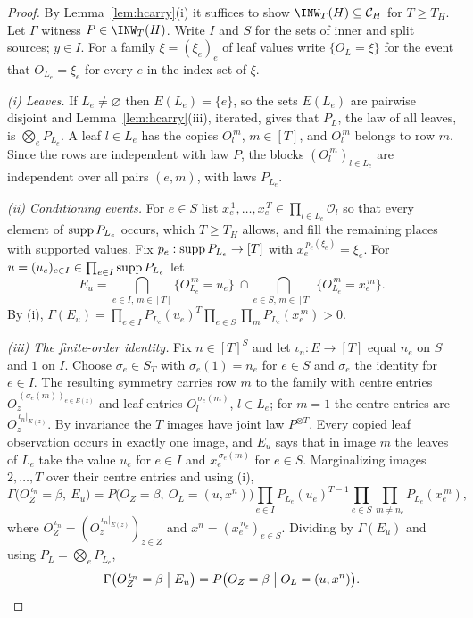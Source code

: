 \begin{proof}
By Lemma~\ref{lem:hcarry}(i) it suffices to show $\INW_T(H)\subseteq\Cscen{H}$ for $T\ge T_H$. Let $\Gamma$ witness $P\in\INW_T(H)$. Write $I$ and $S$ for the sets of inner and split sources; $y\in I$. For a family $\xi=(\xi_e)_e$ of leaf values write $\{O_L=\xi\}$ for the event that $O_{L_e}=\xi_e$ for every $e$ in the index set of $\xi$.

\emph{(i) Leaves.} If $L_e\ne\varnothing$ then $E(L_e)=\{e\}$, so the sets $E(L_e)$ are pairwise disjoint and Lemma~\ref{lem:hcarry}(iii), iterated, gives that $P_L$, the law of all leaves, is $\bigotimes_eP_{L_e}$. A leaf $l\in L_e$ has the copies $O_l^{\,m}$, $m\in[T]$, and $O_l^{\,m}$ belongs to row $m$. Since the rows are independent with law $P$, the blocks $(O_l^{\,m})_{l\in L_e}$ are independent over all pairs $(e,m)$, with laws $P_{L_e}$.

\emph{(ii) Conditioning events.} For $e\in S$ list $x_e^{\,1},\dots,x_e^{\,T}\in\prod_{l\in L_e}\mathcal O_l$ so that every element of $\operatorname{supp} P_{L_e}$ occurs, which $T\ge T_H$ allows, and fill the remaining places with supported values. Fix $p_e:\operatorname{supp} P_{L_e}\to[T]$ with $x_e^{\,p_e(\xi_e)}=\xi_e$. For $u=(u_e)_{e\in I}\in\prod_{e\in I}\operatorname{supp} P_{L_e}$ let
\[
E_u=\bigcap_{e\in I,\,m\in[T]}\{O_{L_e}^{\,m}=u_e\}\ \cap\bigcap_{e\in S,\,m\in[T]}\{O_{L_e}^{\,m}=x_e^{\,m}\}.
\]
By (i), $\Gamma(E_u)=\prod_{e\in I}P_{L_e}(u_e)^T\prod_{e\in S}\prod_mP_{L_e}(x_e^{\,m})>0$.

\emph{(iii) The finite-order identity.} Fix $n\in[T]^S$ and let $\iota_n:E\to[T]$ equal $n_e$ on $S$ and $1$ on $I$. Choose $\sigma_e\in S_T$ with $\sigma_e(1)=n_e$ for $e\in S$ and $\sigma_e$ the identity for $e\in I$. The resulting symmetry carries row $m$ to the family with centre entries $O_z^{\,(\sigma_e(m))_{e\in E(z)}}$ and leaf entries $O_l^{\,\sigma_e(m)}$, $l\in L_e$; for $m=1$ the centre entries are $O_z^{\,\iota_n|_{E(z)}}$. By invariance the $T$ images have joint law $P^{\otimes T}$. Every copied leaf observation occurs in exactly one image, and $E_u$ says that in image $m$ the leaves of $L_e$ take the value $u_e$ for $e\in I$ and $x_e^{\,\sigma_e(m)}$ for $e\in S$. Marginalizing images $2,\dots,T$ over their centre entries and using (i),
\[
\Gamma\bigl(O_Z^{\,\iota_n}=\beta,\ E_u\bigr)=P\bigl(O_Z=\beta,\ O_{L}=(u,x^n)\bigr)\prod_{e\in I}P_{L_e}(u_e)^{T-1}\prod_{e\in S}\prod_{m\ne n_e}P_{L_e}(x_e^{\,m}),
\]
where $O_Z^{\,\iota_n}=(O_z^{\,\iota_n|_{E(z)}})_{z\in Z}$ and $x^n=(x_e^{\,n_e})_{e\in S}$. Dividing by $\Gamma(E_u)$ and using $P_L=\bigotimes_eP_{L_e}$,
\begin{equation}\label{eq:hcond}
\Gamma\bigl(O_Z^{\,\iota_n}=\beta\bigm|E_u\bigr)=P\bigl(O_Z=\beta\bigm|O_L=(u,x^n)\bigr).
\end{equation}


\end{proof}
